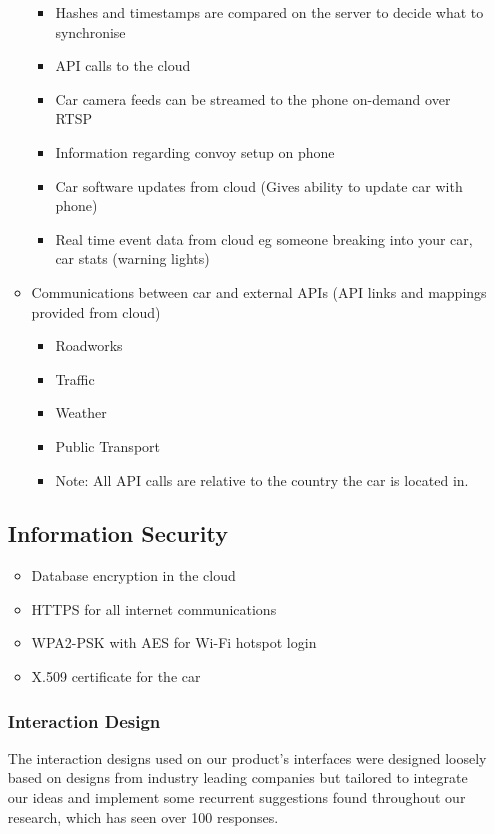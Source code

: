 \documentclass{article}
\begin{document}
\begin{itemize}
\begin{itemize}
\begin{itemize}
        	\item Hashes and timestamps are compared on the server to decide what to synchronise
            \item API calls to the cloud
            \item Car camera feeds can be streamed to the phone on-demand over RTSP
            \item Information regarding convoy setup on phone
            \item Car software updates from cloud (Gives ability to update car with phone)
            \item Real time event data from cloud eg someone breaking into your car, car stats (warning lights)
        \end{itemize}
	  \item Communications between car and external APIs (API links and mappings provided from cloud)
        \begin{itemize}
        	\item Roadworks
            \item Traffic
            \item Weather
            \item Public Transport
            \item Note: All API calls are relative to the country the car is located in.
        \end{itemize}
	\end{itemize}

\subsection{Information Security} \la
	\begin{itemize}
		\item Database encryption in the cloud
        \item HTTPS for all internet communications
        \item WPA2-PSK with AES for Wi-Fi hotspot login
        \item X.509 certificate for the car
	\end{itemize}

\subsubsection{Interaction Design}
The interaction designs used on our product's interfaces were designed loosely based on designs from industry leading companies but tailored to integrate our ideas and implement some recurrent suggestions found throughout our research, which has seen over 100 responses.


\end{itemize}
\end{document}
